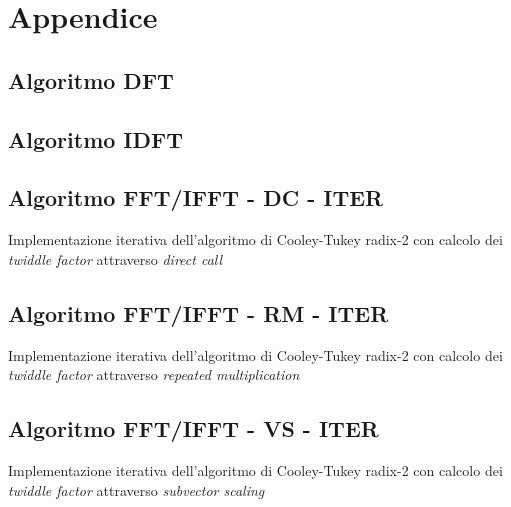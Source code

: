 \newpage
\appendix

\chapter{Appendice}
\section{Algoritmo DFT}

\section{Algoritmo IDFT}

\section{Algoritmo FFT/IFFT - DC - ITER}
Implementazione iterativa dell'algoritmo di Cooley-Tukey radix-2 con calcolo dei \emph{twiddle factor} attraverso \emph{direct call}

\section{Algoritmo FFT/IFFT - RM - ITER}
Implementazione iterativa dell'algoritmo di Cooley-Tukey radix-2 con calcolo dei \emph{twiddle factor} attraverso \emph{repeated multiplication}

\section{Algoritmo FFT/IFFT - VS - ITER}
Implementazione iterativa dell'algoritmo di Cooley-Tukey radix-2 con calcolo dei \emph{twiddle factor} attraverso \emph{subvector scaling}


